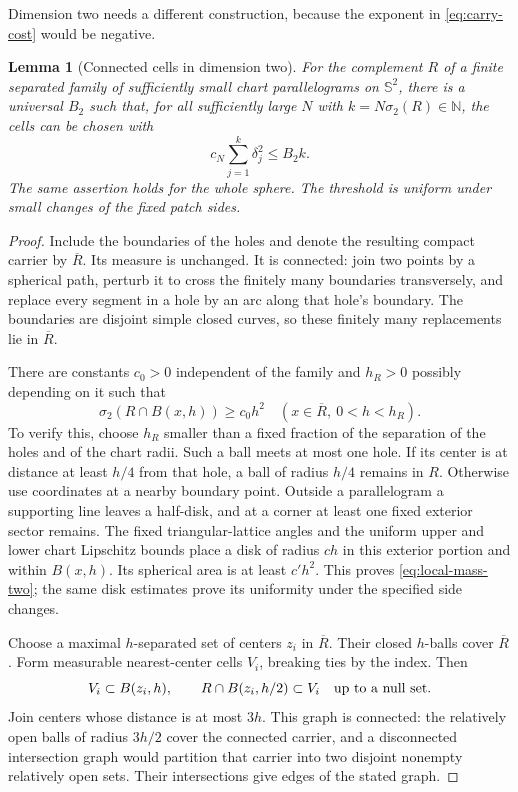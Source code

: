 \documentclass[11pt,a4paper]{article}
\newtheorem{lemma}[theorem]{Lemma}
\theoremstyle{definition}
\newcommand{\N}{\mathbb N}
\newcommand{\Sph}{\mathbb S}
\numberwithin{equation}{section}
\begin{document}
Dimension two needs a different construction, because the exponent in \eqref{eq:carry-cost} would be negative.

\begin{lemma}[Connected cells in dimension two]\label{lem:two-dimensional-cells}
For the complement $R$ of a finite separated family of sufficiently small chart parallelograms on $\Sph^2$, there is a universal $B_2$ such that, for all sufficiently large $N$ with $k=N\sigma_2(R)\in\N$, the cells can be chosen with
\begin{equation}\label{eq:two-cells}
 c_N\sum_{j=1}^k\delta_j^2\le B_2k.
\end{equation}
The same assertion holds for the whole sphere. The threshold is uniform under small changes of the fixed patch sides.
\end{lemma}
\begin{proof}
Include the boundaries of the holes and denote the resulting compact carrier by $\overline R$. Its measure is unchanged. It is connected: join two points by a spherical path, perturb it to cross the finitely many boundaries transversely, and replace every segment in a hole by an arc along that hole's boundary. The boundaries are disjoint simple closed curves, so these finitely many replacements lie in $\overline R$.

There are constants $c_0>0$ independent of the family and $h_R>0$ possibly depending on it such that
\begin{equation}\label{eq:local-mass-two}
 \sigma_2(R\cap B(x,h))\ge c_0h^2
 \quad(x\in\overline R,\ 0<h<h_R).
\end{equation}
To verify this, choose $h_R$ smaller than a fixed fraction of the separation of the holes and of the chart radii. Such a ball meets at most one hole. If its center is at distance at least $h/4$ from that hole, a ball of radius $h/4$ remains in $R$. Otherwise use coordinates at a nearby boundary point. Outside a parallelogram a supporting line leaves a half-disk, and at a corner at least one fixed exterior sector remains. The fixed triangular-lattice angles and the uniform upper and lower chart Lipschitz bounds place a disk of radius $c h$ in this exterior portion and within $B(x,h)$. Its spherical area is at least $c'h^2$. This proves \eqref{eq:local-mass-two}; the same disk estimates prove its uniformity under the specified side changes.

Choose a maximal $h$-separated set of centers $z_i$ in $\overline R$. Their closed $h$-balls cover $\overline R$. Form measurable nearest-center cells $V_i$, breaking ties by the index. Then
\[
 V_i\subset B(z_i,h),\qquad
 R\cap B(z_i,h/2)\subset V_i\quad\hbox{up to a null set}.
\]
Join centers whose distance is at most $3h$. This graph is connected: the relatively open balls of radius $3h/2$ cover the connected carrier, and a disconnected intersection graph would partition that carrier into two disjoint nonempty relatively open sets. Their intersections give edges of the stated graph.


\end{proof}
\end{document}
